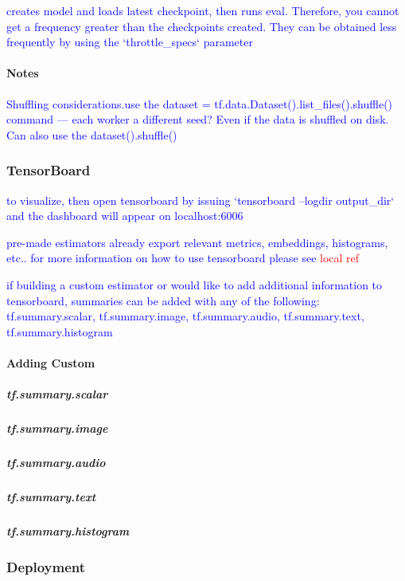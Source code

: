 \textcolor{blue}{creates model and loads latest checkpoint, then runs eval. Therefore, you cannot get a frequency greater than the checkpoints created. They can be obtained less frequently by using the `throttle\_specs` parameter}

\paragraph{Notes}

\textcolor{blue}{Shuffling considerations.use the dataset = tf.data.Dataset().list\_files().shuffle() command --- each worker a different seed? Even if the data is shuffled on disk. Can also use the dataset().shuffle()}

\subsubsection{TensorBoard}


\textcolor{blue}{to visualize, then open tensorboard by issuing `tensorboard --logdir output\_dir` and the dashboard will appear on localhost:6006}

\textcolor{blue}{pre-made estimators already export relevant metrics, embeddings, histograms, etc.. for more information on how to use tensorboard please see \textcolor{red}{local ref}}

\textcolor{blue}{if building a custom estimator or would like to add additional information to tensorboard, summaries can be added with any of the following: tf.summary.scalar, tf.summary.image, tf.summary.audio, tf.summary.text, tf.summary.histogram}

\paragraph{Adding Custom}


\subparagraph{tf.summary.scalar}

\subparagraph{tf.summary.image}

\subparagraph{tf.summary.audio}

\subparagraph{tf.summary.text}

\subparagraph{tf.summary.histogram}


\subsubsection{Deployment}

